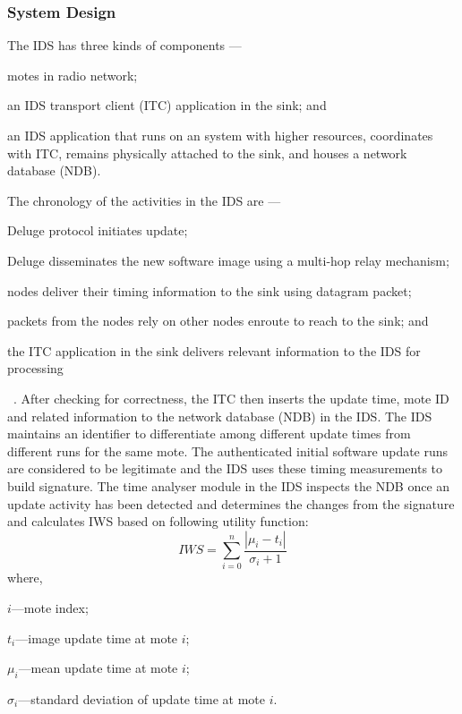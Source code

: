 \documentclass{CRPITStyle}
\renewcommand{\cite}{\citep}
\begin{document}
\subsubsection*{System Design}
The IDS has three kinds of components --- 
\begin{inparaenum}
\item motes in radio network; 
\item an IDS transport client (ITC) application in the sink; and
\item an IDS application that runs on an system with higher resources, coordinates with ITC, remains physically attached to the sink, and houses a network database (NDB).
\end{inparaenum}
The chronology of the activities in the IDS are ---
\begin{inparaenum}
\item Deluge protocol initiates update;
\item Deluge disseminates the new software image using a multi-hop relay mechanism; 
\item nodes deliver their timing information to the sink using datagram packet;
\item packets from the nodes rely on other nodes enroute to reach to the sink; and
\item the ITC application in the sink delivers relevant information to the IDS for processing 
\end{inparaenum}~\cite{tep116}.
After checking for correctness, the ITC then inserts the update time, mote ID and related information to the network database (NDB) in the IDS.
The IDS maintains an identifier to differentiate among different update times from different runs for the same mote.
The authenticated initial software update runs are considered to be legitimate and the IDS uses these timing measurements to build signature.
The time analyser module in the IDS inspects the NDB once an update activity has been detected and determines the changes from the signature and calculates IWS based on following utility function:
\begin{equation}
\label{eqn2} 
	\mathit{IWS} = \sum \limits_{i=0}^{n} \frac{\left| \mu_i - t_i \right|}{\sigma_i + 1}
\end{equation}
where, 
\begin{inparaenum}
\item $\mathit{i}$---mote index;%
\item $\mathit{t_i}$---image update time at mote $\mathit{i}$;  
\item $\mathit{\mu_i}$---mean update time at mote $\mathit{i}$;  
\item $\mathit{\sigma_i}$---standard deviation of update time at mote $\mathit{i}$. 
\end{inparaenum}	
\end{document}
